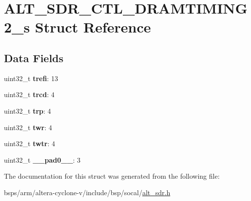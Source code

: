 \hypertarget{structALT__SDR__CTL__DRAMTIMING2__s}{}\section{A\+L\+T\+\_\+\+S\+D\+R\+\_\+\+C\+T\+L\+\_\+\+D\+R\+A\+M\+T\+I\+M\+I\+N\+G2\+\_\+s Struct Reference}
\label{structALT__SDR__CTL__DRAMTIMING2__s}
\subsection*{Data Fields}
\begin{DoxyCompactItemize}
\item 
\mbox{\label{structALT__SDR__CTL__DRAMTIMING2__s_a13b43d6bb84c29165103fc1b2d337b12}} 
uint32\+\_\+t {\bfseries trefi}\+: 13
\item 
\mbox{\label{structALT__SDR__CTL__DRAMTIMING2__s_a27a8ec232a0e2c310fd9bee42aa7ce70}} 
uint32\+\_\+t {\bfseries trcd}\+: 4
\item 
\mbox{\label{structALT__SDR__CTL__DRAMTIMING2__s_a22275f09595f6c8531d16f90e0f3c418}} 
uint32\+\_\+t {\bfseries trp}\+: 4
\item 
\mbox{\label{structALT__SDR__CTL__DRAMTIMING2__s_aefbcd0ec82a114316367f744f932a0ed}} 
uint32\+\_\+t {\bfseries twr}\+: 4
\item 
\mbox{\label{structALT__SDR__CTL__DRAMTIMING2__s_a3137a417c3f4088b8734534471c8bcb0}} 
uint32\+\_\+t {\bfseries twtr}\+: 4
\item 
\mbox{\label{structALT__SDR__CTL__DRAMTIMING2__s_adf3b3b5bcc3ba98ca5c685997b7f0e06}} 
uint32\+\_\+t {\bfseries \+\_\+\+\_\+pad0\+\_\+\+\_\+}\+: 3
\end{DoxyCompactItemize}


The documentation for this struct was generated from the following file\+:\begin{DoxyCompactItemize}
\item 
bsps/arm/altera-\/cyclone-\/v/include/bsp/socal/\mbox{\hyperlink{alt__sdr_8h}{alt\+\_\+sdr.\+h}}\end{DoxyCompactItemize}
